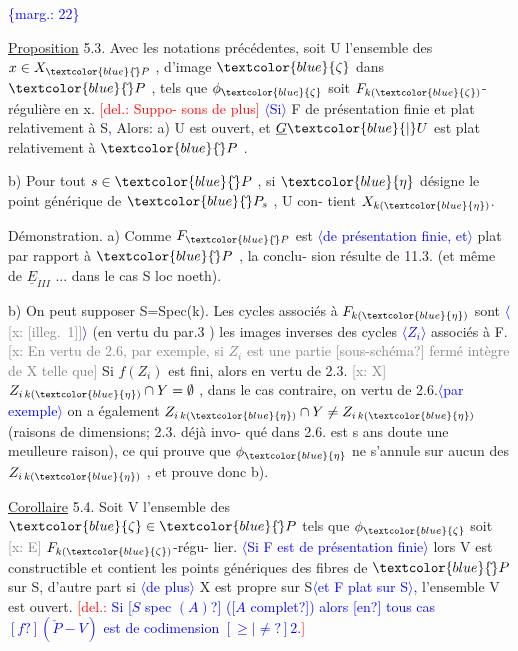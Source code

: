 \documentclass[11pt]{article}
\newcommand{\scanpage}[1]{\par\bigskip\noindent{\small\sffamily[scan #1]}\par}
\newcommand{\mspage}[1]{{\small\sffamily[p.\,#1]}}
\newcommand{\hand}[1]{\textcolor{blue}{#1}}
\let\over\relax
\newcommand{\over}[2]{\textcolor{gray}{#1}\textcolor{blue}{\ensuremath{^{\!\nearrow}}#2}}
\newcommand{\inserted}[2][]{\textcolor{blue}{$\langle$#2$\rangle$}}
\newcommand{\margin}[1]{\textcolor{blue}{\{\textsf{marg.:} #1\}}}
\newcommand{\deleted}[1]{\textcolor{red}{[\textsf{del.:} #1]}}
\newcommand{\xout}[1]{\textcolor{gray}{[\textsf{x:} #1]}}
\newcommand{\uline}[1]{\underline{#1}}
\newcommand{\unsure}[1]{[#1?]}
\newcommand{\illegible}[1]{[\textsf{illeg.\ #1}]}
\begin{document}
\margin{22}

\clearpage
\scanpage{25/23}
\mspage{\hand{20}}

\uline{Proposition} 5.3.   Avec les notations précédentes, soit U l'ensemble des
$x\in X_{\hand{\check{}}P}$ , d'image $\hand{\zeta}$ dans $\hand{\check{}}P$ , tels que $\phi_{\hand{\zeta}}$ soit $F_{k(\hand{\zeta})}$-régulière en x. \deleted{Suppo-%
sons de plus} \inserted{Si} F de présentation finie et plat relativement à S\hand{,} Alors:
a) U est ouvert, et $\underline{G}\hand{|}U$ est plat relativement à $\hand{\check{}}P$ .

b) Pour tout $s\in\hand{\check{}}P$ , si $\hand{\eta}$ désigne le point générique de $\hand{\check{}}P_s$ , U con-%
tient $X_{k(\hand{\eta})}$.

Démonstration. a) Comme $F_{\hand{\check{}}P}$ est \inserted[typed]{de présentation finie, et} plat par rapport à $\hand{\check{}}P$ , la conclu-%
sion résulte de 11.3. (et même de $\underline{E}_{III}$ ... dans le cas S loc noeth).

b) On peut supposer S=Spec(k). Les cycles associés à $F_{k(\hand{\eta})}$ sont
\inserted[typed]{\xout{\illegible{1}}}
(en vertu du par.3 ) les images inverses des cycles \inserted{$Z_i$} associés à F. \xout{En
vertu de 2.6, par exemple, si $Z_i$ est une partie \unsure{sous-schéma} fermé intègre
de X telle que} Si $f(Z_i)$ est fini, alors en vertu de 2.3. \xout{X}
$Z_{i\,k(\hand{\eta})}\cap Y = \emptyset$ , dans le cas contraire, on vertu de 2.6.\inserted[typed]{par exemple} on a
également $Z_{i\,k(\hand{\eta})}\cap Y \neq Z_{i\,k(\hand{\eta})}$ (raisons de dimensions; 2.3. déjà invo-%
qué dans 2.6. est s ans doute une meulleure raison), ce qui prouve que $\phi_{\hand{\eta}}$
ne s'annule sur aucun des $Z_{i\,k(\hand{\eta})}$ , et prouve donc b).

\uline{Corollaire} 5.4. Soit V l'ensemble des $\hand{\zeta}\in\hand{\check{}}P$ tels que $\phi_{\hand{\zeta}}$ soit \xout{E} $F_{k(\hand{\zeta})}$-régu-%
lier. \inserted{Si F est de présentation finie} \over{A}{\unsure{a}}lors V est constructible et contient les points génériques des
fibres de $\hand{\check{}}P$ sur S, d'autre part si \inserted{de plus} X est propre sur S\inserted{et F plat sur S}\hand{,} l'ensemble V est
ouvert. \deleted{\hand{Si \unsure{$S$ spec $(A)$} (\unsure{$A$ complet}) alors \unsure{en} tous cas $\unsure{f}(\check{P}-V)$ est
de codimension $\unsure{\geq|\neq} 2$.}}
\end{document}
